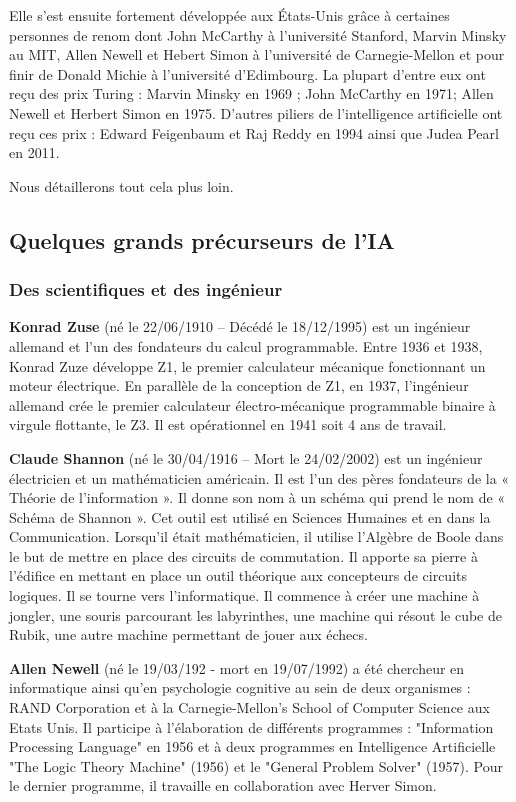 Elle s’est ensuite fortement développée aux États-Unis grâce à certaines personnes de renom dont John McCarthy à l'université Stanford, Marvin Minsky au MIT, Allen Newell et Hebert Simon à l’université de Carnegie-Mellon et pour finir de Donald Michie à l’université d’Edimbourg.
La plupart d’entre eux ont reçu des prix Turing : Marvin Minsky en 1969 ; John McCarthy en 1971; Allen Newell et Herbert Simon en 1975.
D’autres piliers de l’intelligence artificielle ont reçu ces prix : Edward Feigenbaum et Raj Reddy en 1994 ainsi que Judea Pearl en 2011.

Nous détaillerons tout cela plus loin.




\subsection{Quelques grands précurseurs de l'IA}

\subsubsection{ Des scientifiques et des ingénieur}


\textbf{Konrad Zuse} (né le 22/06/1910 – Décédé le 18/12/1995) est un ingénieur allemand et l’un des fondateurs du calcul programmable. Entre  1936 et 1938, Konrad Zuze développe Z1, le premier calculateur mécanique fonctionnant un moteur électrique. En parallèle de la conception de Z1, en 1937, l’ingénieur allemand crée le premier calculateur électro-mécanique programmable binaire à virgule flottante, le Z3. Il est opérationnel en 1941 soit 4 ans de travail.


\textbf{Claude Shannon} (né le 30/04/1916 – Mort le 24/02/2002) est un ingénieur électricien et un mathématicien américain. Il est l’un des pères fondateurs de la « Théorie de l’information ». Il donne son nom à un schéma qui prend le nom de « Schéma de Shannon ». Cet outil est utilisé en Sciences Humaines et en dans  la Communication. Lorsqu’il était mathématicien, il utilise l’Algèbre de Boole dans le but de mettre en place des circuits de commutation. Il apporte sa pierre à l’édifice en mettant en place un outil théorique aux concepteurs de circuits logiques. Il se tourne vers l’informatique. Il commence à créer une machine à jongler, une souris parcourant les labyrinthes, une machine qui résout le cube de Rubik, une autre machine permettant de jouer aux échecs.

 
\textbf{Allen Newell} (né le 19/03/192 - mort en 19/07/1992) a été chercheur en informatique ainsi qu'en psychologie cognitive au sein de deux organismes : RAND Corporation et à la Carnegie-Mellon’s School of Computer Science aux Etats Unis. Il participe à l'élaboration de différents programmes : "Information Processing Language" en 1956 et à deux programmes en Intelligence Artificielle "The Logic Theory Machine" (1956) et le "General Problem Solver" (1957). Pour le dernier programme, il travaille en collaboration avec Herver Simon.


